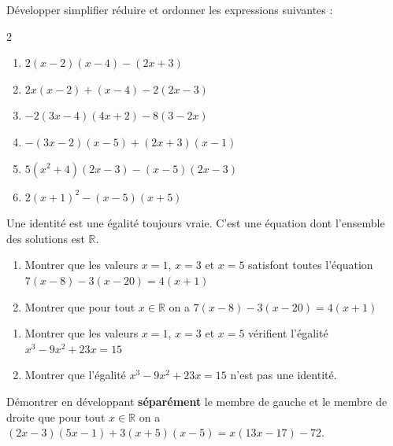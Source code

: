 \documentclass[main.tex]{subfiles}
\begin{document}
\begin{exercise}[Mélange]\label{chap07:exo:melange} Développer simplifier réduire et ordonner les expressions suivantes :
	\vspace{-0.5em}
\begin{multicols}{2}
	\begin{enumerate}[label={$\Alph*=$},leftmargin=*]
		\item  $2\left(x-2\right)\left(x-4\right)-\left(2x+3\right)$  
		\item  $2x\left(x-2\right)+\left(x-4\right)-2\left(2x-3\right)$  
		\item  $-2\left(3x-4\right)\left(4x+2\right)-8\left(3-2x\right)$
		\item  $-\left(3x-2\right)\left(x-5\right)+\left(2x +3\right)\left(x-1\right)$
		\item  $5\left(x^2+4\right)\left(2x-3\right)-\left(x-5\right)\left(2x-3\right)$
		\item  $2\left(x+1\right)^2-\left(x-5\right)\left(x+5\right)$
	\end{enumerate}
\end{multicols} 
\end{exercise}
\begin{eBox}
	Une identité est une égalité toujours vraie. C'est une équation dont l'ensemble des solutions est $\mathbb{R}$.
\end{eBox}
\begin{exercise}\hfill 
	\begin{enumerate}[label=\alph*),leftmargin=*]
		\item Montrer que les valeurs $x=1$, $x=3$ et $x=5$ satisfont toutes l'équation $7(x-8)-3(x-20)=4(x+1)$
		\item Montrer que pour tout $x\in\mathbb{R}$   on a	$ 7(x-8)-3(x-20)=4(x+1) $
	\end{enumerate} 
\end{exercise}
\begin{exercise} \hfill 
	\begin{enumerate}[label=\alph*),leftmargin=*]
		\item Montrer que les valeurs $x=1$, $x=3$ et $x=5$ vérifient l'égalité $x^3-9x^2+23x=15$
		\item Montrer que l'égalité $ x^3-9x^2+23x=15$ n'est pas une identité. 
	\end{enumerate} 
\end{exercise}
\begin{exercise} Démontrer en développant \textbf{séparément} le membre de gauche et le membre de droite que pour tout $x\in\mathbb{R}$ on a $(2x-3)(5x-1)+3(x+5)(x-5) = x(13x-17)-72$.  
\end{exercise}
\end{document}

